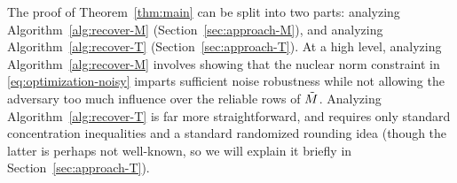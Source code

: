 The proof of Theorem~\ref{thm:main} can be split into two parts: analyzing 
Algorithm~\ref{alg:recover-M} (Section~\ref{sec:approach-M}), 
and analyzing Algorithm~\ref{alg:recover-T} (Section~\ref{sec:approach-T}). 
At a high level, analyzing Algorithm~\ref{alg:recover-M} involves showing that 
the nuclear norm constraint in \eqref{eq:optimization-noisy} imparts sufficient 
noise robustness while not allowing the adversary too much influence over the 
reliable rows of $\tilde{M}$. Analyzing Algorithm~\ref{alg:recover-T} is far more 
straightforward, 
and requires only standard concentration inequalities and a standard randomized 
rounding idea (though the latter is perhaps not well-known, so we will explain 
it briefly in Section~\ref{sec:approach-T}).

